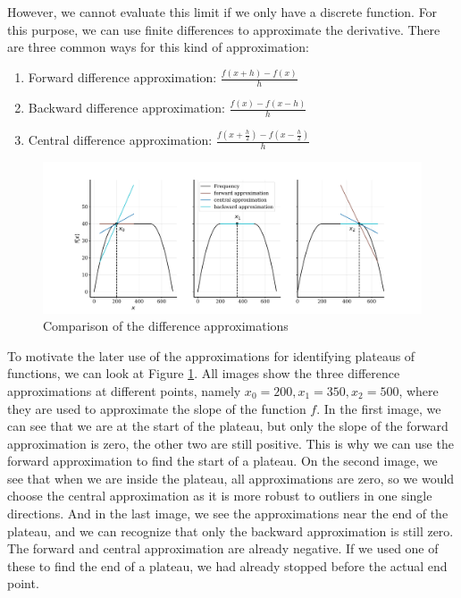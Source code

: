 However, we cannot evaluate this limit if we only have a discrete function. For this purpose, we can use finite differences to approximate the derivative. There are three common ways for this kind of approximation:
\begin{enumerate}
    \item Forward difference approximation: $\frac{f(x + h) - f(x)}{h}$
    \item Backward difference approximation: $\frac{f(x) - f(x-h)}{h}$
    \item Central difference approximation: $\frac{f(x + \frac{h}{2}) - f(x - \frac{h}{2})}{h}$
\end{enumerate}

\begin{figure}[H]
    \centering
    \includegraphics[width=\textwidth]{figures/approximations.pdf}
    \caption{Comparison of the difference approximations}
    \label{fig:approximations}
\end{figure}

To motivate the later use of the approximations for identifying plateaus of functions, we can look at Figure \ref{fig:approximations}. All images show the three difference approximations at different points, namely $x_0 = 200, x_1 = 350, x_2 = 500$, where they are used to approximate the slope of the function $f$. In the first image, we can see that we are at the start of the plateau, but only the slope of the forward approximation is zero, the other two are still positive. This is why we can use the forward approximation to find the start of a plateau. On the second image, we see that when we are inside the plateau, all approximations are zero, so we would choose the central approximation as it is more robust to outliers in one single directions. And in the last image, we see the approximations near the end of the plateau, and we can recognize that only the backward approximation is still zero. The forward and central approximation are already negative. If we used one of these to find the end of a plateau, we had already stopped before the actual end point.

